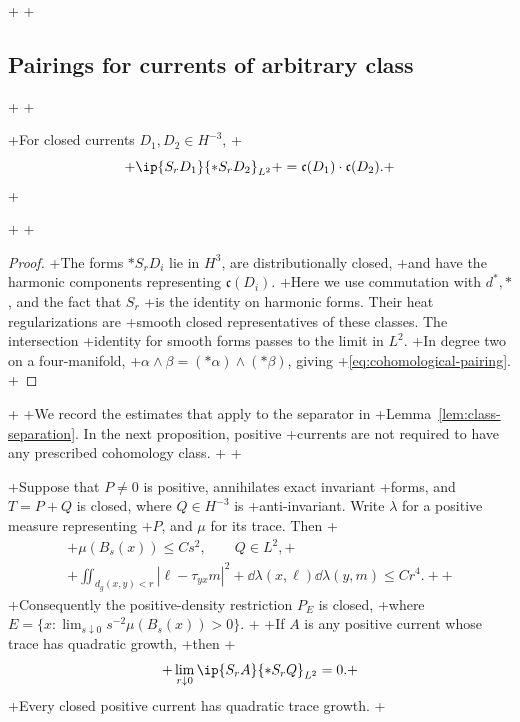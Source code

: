 +
+\subsection{Pairings for currents of arbitrary class}
+
+\begin{lemma}\label{lem:cohomological-pairing}
+For closed currents \(D_1,D_2\in H^{-3}\),
+\begin{equation}\label{eq:cohomological-pairing}
+ \ip{S_rD_1}{*S_rD_2}_{L^2}
+ =\mathfrak c(D_1)\cdot\mathfrak c(D_2).
+\end{equation}
+\end{lemma}
+
+\begin{proof}
+The forms \(*S_rD_i\) lie in \(H^3\), are distributionally closed,
+and have the harmonic components representing \(\mathfrak c(D_i)\).
+Here we use commutation with \(d^*,*\), and the fact that \(S_r\)
+is the identity on harmonic forms. Their heat regularizations are
+smooth closed representatives of these classes. The intersection
+identity for smooth forms passes to the limit in \(L^2\).
+In degree two on a four-manifold,
+\(\alpha\wedge\beta=(*\alpha)\wedge(*\beta)\), giving
+\eqref{eq:cohomological-pairing}.
+\end{proof}
+
+We record the estimates that apply to the separator in
+Lemma~\ref{lem:class-separation}. In the next proposition, positive
+currents are not required to have any prescribed cohomology class.
+
+\begin{proposition}\label{prop:class-estimates}
+Suppose that \(P\ne0\) is positive, annihilates exact invariant
+forms, and \(T=P+Q\) is closed, where \(Q\in H^{-3}\) is
+anti-invariant. Write \(\lambda\) for a positive measure representing
+\(P\), and \(\mu\) for its trace. Then
+\begin{gather}
+ \mu(B_s(x))\le Cs^2,\qquad Q\in L^2,
+ \label{eq:class-growth}\\
+ \iint_{d_g(x,y)<r}|\ell-\tau_{yx}m|^2
+       \dd\lambda(x,\ell)\dd\lambda(y,m)\le Cr^4.
+ \label{eq:class-angular}
+\end{gather}
+Consequently the positive-density restriction \(P_E\) is closed,
+where \(E=\{x:\lim_{s\downarrow0}s^{-2}\mu(B_s(x))>0\}\).
+
+If \(A\) is any positive current whose trace has quadratic growth,
+then
+\begin{equation}\label{eq:class-mixed-limit}
+ \lim_{r\downarrow0}\ip{S_rA}{*S_rQ}_{L^2}=0.
+\end{equation}
+Every closed positive current has quadratic trace growth.
+\end{proposition}
